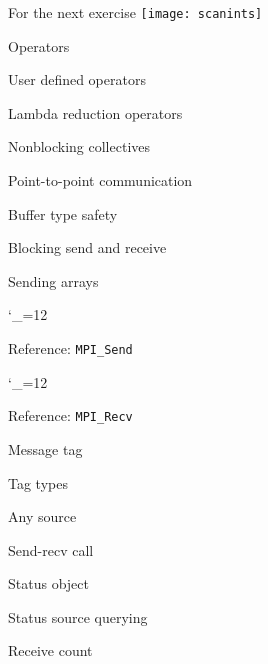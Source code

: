 \documentclass[10pt]{beamer}
\newcommand\referenceframe{\begingroup\catcode`\_=12 \referenceframett}
\gdef\referenceframett#1{
  \begin{numberedframe}{Reference: \texttt{MPI_#1}}
    \small
    
  \end{numberedframe}\endgroup}
\begin{document}
\begin{numberedframe}{For the next exercise}
  \label{fig:scanints}
  \texttt{[image: scanints]}
\end{numberedframe}
\begin{exerciseframe}[scangather]
  
\end{exerciseframe}
\begin{exerciseframe}[scangather]
  
\end{exerciseframe}

\begin{numberedframe}{Operators}
  
\end{numberedframe}
\begin{numberedframe}{User defined operators}
  
\end{numberedframe}
\begin{numberedframe}{Lambda reduction operators}
  
\end{numberedframe}
\begin{numberedframe}{Nonblocking collectives}
  
\end{numberedframe}

 {Point-to-point communication}

\begin{numberedframe}{Buffer type safety}
  
\end{numberedframe}
\begin{numberedframe}{Blocking send and receive}
  
\end{numberedframe}
\begin{numberedframe}{Sending arrays}
  
\end{numberedframe}
\referenceframe{Send}
\referenceframe{Recv}
\begin{numberedframe}{Message tag}
  
\end{numberedframe}
\begin{numberedframe}{Tag types}
  
\end{numberedframe}
\begin{numberedframe}{Any source}
  
\end{numberedframe}
\begin{numberedframe}{Send-recv call}
  
\end{numberedframe}
\begin{numberedframe}{Status object}
  
\end{numberedframe}
\begin{numberedframe}{Status source querying}
  
\end{numberedframe}
\begin{numberedframe}{Receive count}
  
\end{numberedframe}
\end{document}
